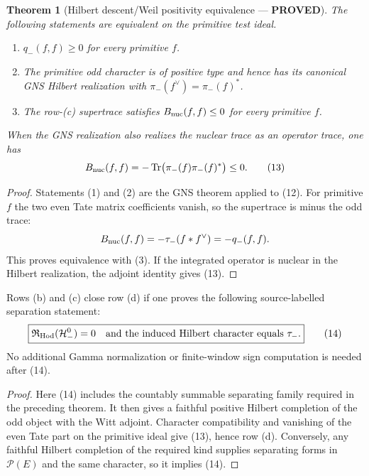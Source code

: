 \documentclass[11pt]{article}
\newcommand{\PROVED}{\textcolor{green!40!black}{\textbf{PROVED}}}
\newtheorem{theorem}{Theorem}
\begin{document}
\begin{theorem}[Hilbert descent/Weil positivity equivalence --- \PROVED]
The following statements are equivalent on the primitive test ideal.
\begin{enumerate}
\item $q_-(f,f)\ge0$ for every primitive $f$.
\item The primitive odd character is of positive type and hence has its
      canonical GNS Hilbert realization with
      $\pi_-(f^\vee)=\pi_-(f)^*$.
\item The row-(c) supertrace satisfies
      $B_{\rm nuc}(f,f)\le0$ for every primitive $f$.
\end{enumerate}
When the GNS realization also realizes the nuclear trace as an operator
trace, one has
\begin{equation}
 B_{\rm nuc}(f,f)
 =-\operatorname{Tr}\bigl(\pi_-(f)\pi_-(f)^*\bigr)\le0.        \tag{13}
\end{equation}
\end{theorem}

\begin{proof}
Statements (1) and (2) are the GNS theorem applied to (12).  For primitive
$f$ the two even Tate matrix coefficients vanish, so the supertrace is
minus the odd trace:
\[
 B_{\rm nuc}(f,f)=-\tau_-(f*f^\vee)=-q_-(f,f).
\]
This proves equivalence with (3).  If the integrated operator is nuclear
in the Hilbert realization, the adjoint identity gives (13).
\end{proof}

\begin{corollary}[Exact new target --- \PROVED]
Rows (b) and (c) close row (d) if one proves the following source-labelled
separation statement:
\begin{equation}
 \boxed{
 \mathfrak R_{\rm Hod}(\mathcal H_-^0)=0
 \quad\text{and the induced Hilbert character equals }\tau_- .}           \tag{14}
\end{equation}
No additional Gamma normalization or finite-window sign computation is
needed after (14).
\end{corollary}

\begin{proof}
Here (14) includes the countably summable separating family required in the
preceding theorem.  It then gives a faithful positive Hilbert completion of
the odd object with the Witt adjoint.  Character
compatibility and vanishing of the even Tate part on the primitive ideal
give (13), hence row (d).  Conversely, any faithful Hilbert completion of
the required kind supplies separating forms in $\mathscr P(E)$ and the
same character, so it implies (14).
\end{proof}
\end{document}
